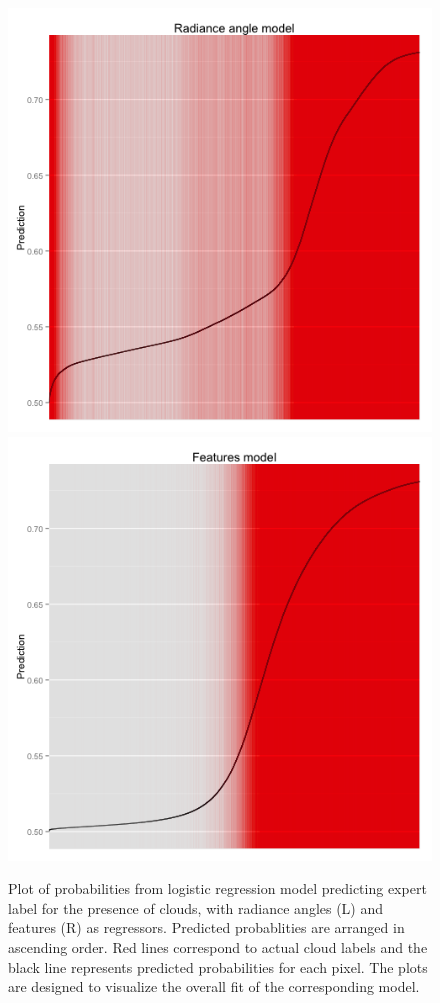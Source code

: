 \documentclass[11pt]{article}\usepackage[]{graphicx}\usepackage[]{color}
\newenvironment{knitrout}{}{} %
\begin{document}
\begin{knitrout}
\color{fgcolor}\begin{figure}[]

\includegraphics[width=0.49\linewidth]{figure/logistic-plots-1} 
\includegraphics[width=0.49\linewidth]{figure/logistic-plots-2} \caption[Plot of probabilities from logistic regression model predicting expert label for the presence of clouds, with radiance angles (L) and features (R) as regressors]{Plot of probabilities from logistic regression model predicting expert label for the presence of clouds, with radiance angles (L) and features (R) as regressors. Predicted probablities are arranged in ascending order. Red lines correspond to actual cloud labels and the black line represents predicted probabilities for each pixel. The plots are designed to visualize the overall fit of the corresponding model.\label{fig:logistic-plots}}
\end{figure}


\end{knitrout}
\end{document}

